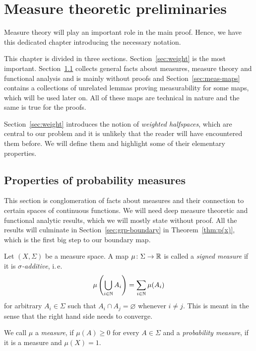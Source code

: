 \section{Measure theoretic preliminaries}
\label{sec:measure}

Measure theory will play an important role in the main proof. Hence, we have this dedicated chapter introducing the necessary notation.

This chapter is divided in three sections. Section~\ref{sec:weight} is the most important. Section~\ref{sec:prob} collects general facts about measures, measure theory and functional analysis and is mainly without proofs and Section~\ref{sec:meas-maps} contains a collections of unrelated lemmas proving measurability for some maps, which will be used later on. All of these maps are technical in nature and the same is true for the proofs.

Section~\ref{sec:weight} introduces the notion of \emph{weighted halfspaces}, which are central to our problem and it is unlikely that the reader will have encountered them before. We will define them and highlight some of their elementary properties.

\subsection{Properties of probability measures}
\label{sec:prob}

This section is conglomeration of facts about measures and their connection to certain spaces of continuous functions. We will need deep measure theoretic and functional analytic results, which we will mostly state without proof. All the results will culminate in Section~\ref{sec:grp-boundary} in Theorem~\ref{thm:p(x)}, which is the first big step to our boundary map.

\begin{defin}
  Let \((X, \Sigma)\) be a measure space. A map \(\mu \colon \Sigma \to \mathbb{R}\) is called a \emph{signed measure} if it is \emph{\(\sigma\)-additive}, i.\,e.
  \[
    \mu\left(\bigcup_{i \in \mathbb{N}}A_i \right) = \sum_{i \in \mathbb{N}} \mu(A_i)
  \]
  for arbitrary \(A_i \in \Sigma\) such that \(A_i \cap A_j = \varnothing\) whenever \(i \neq j\). This is meant in the sense that the right hand side needs to converge.

  We call \(\mu\) a \emph{measure}, if \(\mu(A) \geq 0\) for every \(A \in \Sigma\) and a \emph{probability measure}, if it is a measure and \(\mu(X) = 1\).
\end{defin}

